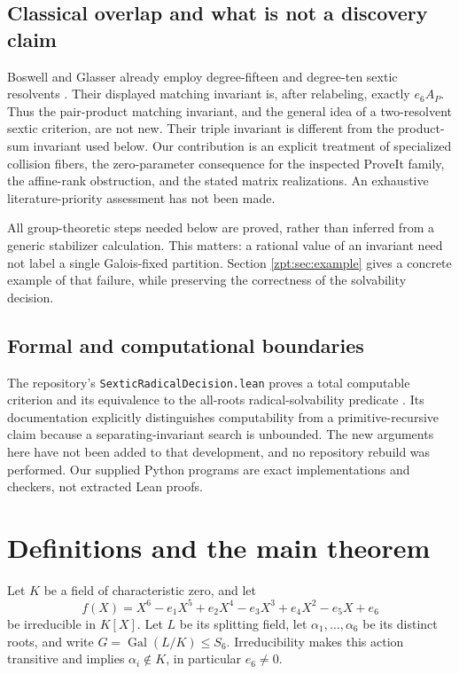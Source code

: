 \documentclass[11pt,letterpaper]{article}
\numberwithin{equation}{section}
\theoremstyle{definition}
\theoremstyle{remark}
\DeclareMathOperator{\Gal}{Gal}
\newcommand{\code}[1]{\texttt{\small #1}}
\begin{document}
\subsection{Classical overlap and what is not a discovery claim}
Boswell and Glasser already employ degree-fifteen and degree-ten sextic
resolvents \cite{boswell-glasser}. Their displayed matching invariant is,
after relabeling, exactly $e_6 A_P$. Thus the pair-product matching invariant,
and the general idea of a two-resolvent sextic criterion, are not new.
Their triple invariant is different from the product-sum invariant used
below. Our contribution is an explicit treatment of specialized collision
fibers, the zero-parameter consequence for the inspected ProveIt family,
the affine-rank obstruction, and the stated matrix realizations. An
exhaustive literature-priority assessment has not been made.

All group-theoretic steps needed below are proved, rather than inferred
from a generic stabilizer calculation. This matters: a rational value of an
invariant need not label a single Galois-fixed partition. Section
\ref{zpt:sec:example} gives a concrete example of that failure, while preserving
the correctness of the solvability decision.

\subsection{Formal and computational boundaries}
The repository's \code{SexticRadicalDecision.lean} proves a total computable
criterion and its equivalence to the all-roots radical-solvability predicate
\cite{repo-decision}. Its documentation explicitly distinguishes computability
from a primitive-recursive claim because a separating-invariant search is
unbounded. The new arguments here have not been added to that development,
and no repository rebuild was performed. Our supplied Python programs are
exact implementations and checkers, not extracted Lean proofs.

\section{Definitions and the main theorem}
\label{zpt:sec:definitions}
Let $K$ be a field of characteristic zero, and let
\begin{equation}
 f(X)=X^6-e_1X^5+e_2X^4-e_3X^3+e_4X^2-e_5X+e_6
 \label{zpt:eq:f}
\end{equation}
be irreducible in $K[X]$. Let $L$ be its splitting field, let
$\alpha_1,\ldots,\alpha_6$ be its distinct roots, and write
$G=\Gal(L/K)\le S_6$. Irreducibility makes this action transitive and implies
$\alpha_i\notin K$, in particular $e_6\ne0$.
\end{document}
